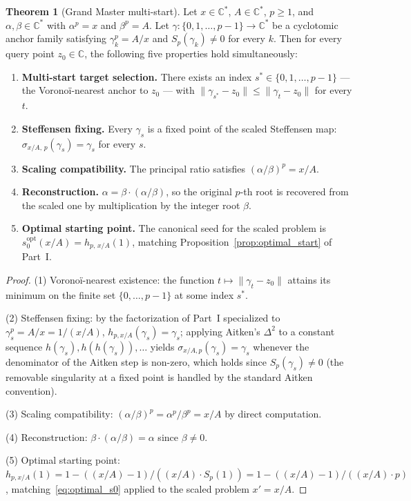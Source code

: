 \documentclass[11pt,a4paper]{article}
\theoremstyle{definition}
\newtheorem{theorem}{Theorem}[section]
\begin{document}
\begin{theorem}[Grand Master multi-start]\label{thm:grand-master}
Let $x \in \mathbb{C}^\ast$, $A \in \mathbb{C}^\ast$, $p \geq 1$, and $\alpha, \beta \in \mathbb{C}^\ast$ with $\alpha^p = x$ and $\beta^p = A$. Let $\gamma : \{0, 1, \ldots, p-1\} \to \mathbb{C}^\ast$ be a cyclotomic anchor family satisfying $\gamma_k^p = A/x$ and $S_p(\gamma_k) \neq 0$ for every $k$. Then for every query point $z_0 \in \mathbb{C}$, the following five properties hold simultaneously:
\begin{enumerate}
  \item[(1)] \textbf{Multi-start target selection.} There exists an index $s^\ast \in \{0, 1, \ldots, p-1\}$ --- the Voronoï-nearest anchor to $z_0$ --- with $\|\gamma_{s^\ast} - z_0\| \leq \|\gamma_t - z_0\|$ for every $t$.
  \item[(2)] \textbf{Steffensen fixing.} Every $\gamma_s$ is a fixed point of the scaled Steffensen map: $\sigma_{x/A,\,p}(\gamma_s) = \gamma_s$ for every $s$.
  \item[(3)] \textbf{Scaling compatibility.} The principal ratio satisfies $(\alpha/\beta)^p = x/A$.
  \item[(4)] \textbf{Reconstruction.} $\alpha = \beta \cdot (\alpha/\beta)$, so the original $p$-th root is recovered from the scaled one by multiplication by the integer root $\beta$.
  \item[(5)] \textbf{Optimal starting point.} The canonical seed for the scaled problem is $s_0^{\mathrm{opt}}(x/A) = h_{p,\,x/A}(1)$, matching Proposition~\ref{prop:optimal_start} of Part~I.
\end{enumerate}
\end{theorem}

\begin{proof}
(1) Voronoï-nearest existence: the function $t \mapsto \|\gamma_t - z_0\|$ attains its minimum on the finite set $\{0, \ldots, p-1\}$ at some index $s^\ast$.

(2) Steffensen fixing: by the factorization of Part~I specialized to $\gamma_s^p = A/x = 1/(x/A)$, $h_{p, x/A}(\gamma_s) = \gamma_s$; applying Aitken's $\Delta^2$ to a constant sequence $h(\gamma_s), h(h(\gamma_s)), \ldots$ yields $\sigma_{x/A, p}(\gamma_s) = \gamma_s$ whenever the denominator of the Aitken step is non-zero, which holds since $S_p(\gamma_s) \neq 0$ (the removable singularity at a fixed point is handled by the standard Aitken convention).

(3) Scaling compatibility: $(\alpha/\beta)^p = \alpha^p/\beta^p = x/A$ by direct computation.

(4) Reconstruction: $\beta \cdot (\alpha/\beta) = \alpha$ since $\beta \neq 0$.

(5) Optimal starting point: $h_{p, x/A}(1) = 1 - ((x/A) - 1)/((x/A) \cdot S_p(1)) = 1 - ((x/A) - 1)/((x/A) \cdot p)$, matching~\eqref{eq:optimal_s0} applied to the scaled problem $x' = x/A$.
\end{proof}
\end{document}
